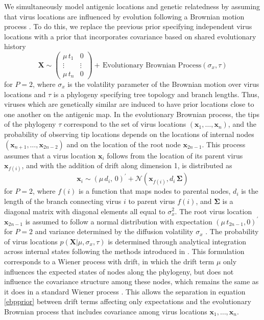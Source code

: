 \documentclass[11pt,oneside,letterpaper]{article}
\newcommand{\virus}{\mathbf{x}}						%
\newcommand{\viruses}{\mathbf{X}}					%
\newcommand{\virussd}{\sigma_x}						%
\newcommand{\drift}{\mu}							%
\newcommand{\tree}{\tau}							%
\newcommand{\vn}{n}									%
\newcommand{\normal}{\mathcal{N}}					%
\begin{document}
We simultaneously model antigenic locations and genetic relatedness by assuming that virus locations are influenced by evolution following a Brownian motion process \cite{Lemey10}.
To do this, we replace the previous prior specifying independent virus locations with a prior that incorporates covariance based on shared evolutionary history
\begin{equation} \label{ebpprior}
	\viruses \sim \left( \begin{matrix} \drift \, t_1 & 0 \\ \vdots & \vdots \\ \drift \, t_n & 0 \end{matrix} \right) + \, \mbox{Evolutionary Brownian Process}(\virussd, \tree)
\end{equation}
for $P=2$, where $\virussd$ is the volatility parameter of the Brownian motion over virus locations and $\tree$ is a phylogeny specifying tree topology and branch lengths.
Thus, viruses which are genetically similar are induced to have prior locations close to one another on the antigenic map.
In the evolutionary Brownian process, the tips of the phylogeny $\tree$ correspond to the set of virus locations $(\virus_1, \ldots, \virus_\vn)$, and the probability of observing tip locations depends on the locations of internal nodes $(\virus_{n+1}, \ldots, \virus_{2\vn-2})$ and on the location of the root node $\virus_{2\vn-1}$.
This process assumes that a virus location $\virus_i$ follows from the location of its parent virus $\virus_{f(i)}$, and with the addition of drift along dimension 1, is distributed as
\begin{equation} 
	\virus_i \sim (\drift \, d_i, \, 0)^{\prime} + \normal(\virus_{f(i)}, d_i \, \boldsymbol{\Sigma})
\end{equation}
for $P=2$, where $f(i)$ is a function that maps nodes to parental nodes, $d_i$ is the length of the branch connecting virus $i$ to parent virus $f(i)$, and $\boldsymbol{\Sigma}$ is a diagonal matrix with diagonal elements all equal to $\virussd^2$.
The root virus location $\virus_{2\vn-1}$ is assumed to follow a normal distribution with expectation $(\drift \, t_{2\vn-1}, 0)^{\prime}$ for $P=2$ and variance determined by the diffusion volatility $\virussd$ \cite{Lemey10}.
The probability of virus locations $p(\viruses | \drift, \virussd, \tree)$ is determined through analytical integration across internal states following the methods introduced in \cite{Lemey10}.
This formulation corresponds to a Wiener process with drift, in which the drift term $\drift$ only influences the expected states of nodes along the phylogeny, but does not influence the covariance structure among these nodes, which remains the same as it does in a standard Wiener process \cite{BrownianMotionHandbook}.
This allows the separation in equation \ref{ebpprior} between drift terms affecting only expectations and the evolutionary Brownian process that includes covariance among virus locations $\virus_1,\ldots,\virus_n$.
\end{document}
